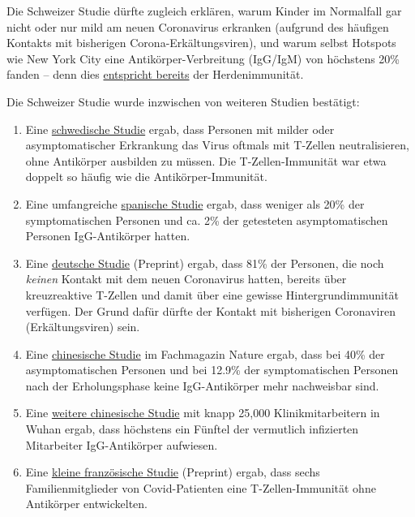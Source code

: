 Die Schweizer Studie dürfte zugleich erklären, warum Kinder im
Normalfall gar nicht oder nur mild am neuen Coronavirus erkranken
(aufgrund des häufigen Kontakts mit bisherigen Corona-Erkältungsviren),
und warum selbst Hotspots wie New York City eine Antikörper-Verbreitung
(IgG/IgM) von höchstens 20\% fanden -- denn dies
\href{https://theconversation.com/coronavirus-could-it-be-burning-out-after-20-of-a-population-is-infected-141584}{entspricht
bereits} der Herdenimmunität.

Die Schweizer Studie wurde inzwischen von weiteren Studien bestätigt:

\begin{enumerate}
\def\labelenumi{\arabic{enumi}.}
\tightlist
\item
  Eine
  \href{https://news.ki.se/immunity-to-covid-19-is-probably-higher-than-tests-have-shown}{schwedische
  Studie} ergab, dass Personen mit milder oder asymptomatischer
  Erkrankung das Virus oftmals mit T-Zellen neutralisieren, ohne
  Antikörper ausbilden zu müssen. Die T-Zellen-Immunität war etwa
  doppelt so häufig wie die Antikörper-Immunität.
\item
  Eine umfangreiche
  \href{https://www.thelancet.com/journals/lancet/article/PIIS0140-6736(20)31483-5/fulltext}{spanische
  Studie} ergab, dass weniger als 20\% der~ symptomatischen Personen und
  ca. 2\% der getesteten asymptomatischen Personen IgG-Antikörper
  hatten.
\item
  Eine
  \href{https://www.researchsquare.com/article/rs-35331/v1}{deutsche
  Studie} (Preprint) ergab, dass 81\% der Personen, die noch
  \emph{keinen} Kontakt mit dem neuen Coronavirus hatten, bereits über
  kreuzreaktive T-Zellen und damit über eine gewisse
  Hintergrundimmunität verfügen. Der Grund dafür dürfte der Kontakt mit
  bisherigen Coronaviren (Erkältungsviren) sein.
\item
  Eine
  \href{https://www.nature.com/articles/s41591-020-0965-6}{chinesische
  Studie} im Fachmagazin Nature ergab, dass bei 40\% der
  asymptomatischen Personen und bei 12.9\% der symptomatischen Personen
  nach der Erholungsphase keine IgG-Antikörper mehr nachweisbar sind.
\item
  Eine
  \href{https://www.medrxiv.org/content/10.1101/2020.06.13.20130252v1}{weitere
  chinesische Studie} mit knapp 25,000 Klinikmitarbeitern in Wuhan
  ergab, dass höchstens ein Fünftel der vermutlich infizierten
  Mitarbeiter IgG-Antikörper aufwiesen.
\item
  Eine
  \href{https://www.medrxiv.org/content/10.1101/2020.06.21.20132449v1}{kleine
  französische Studie} (Preprint) ergab, dass sechs Familienmitglieder
  von Covid-Patienten eine T-Zellen-Immunität ohne Antikörper
  entwickelten.
\end{enumerate}

